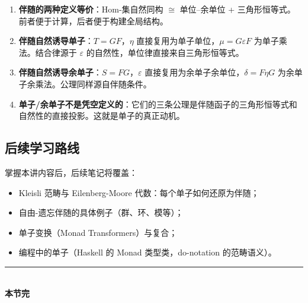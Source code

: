 \documentclass[12pt,a4paper]{ctexart}
\theoremstyle{definition}
\begin{document}
\begin{enumerate}[nosep]
    \item \textbf{伴随的两种定义等价}：Hom-集自然同构 $\cong$ 单位--余单位 + 三角形恒等式。前者便于计算，后者便于构建全局结构。
    \item \textbf{伴随自然诱导单子}：$T = GF$，$\eta$ 直接复用为单子单位，$\mu = G\varepsilon F$ 为单子乘法。结合律源于 $\varepsilon$ 的自然性，单位律直接来自三角形恒等式。
    \item \textbf{伴随自然诱导余单子}：$S = FG$，$\varepsilon$ 直接复用为余单子余单位，$\delta = F\eta G$ 为余单子余乘法。公理同样源自伴随条件。
    \item \textbf{单子/余单子不是凭空定义的}：它们的三条公理是伴随函子的三角形恒等式和自然性的直接投影。这就是单子的真正动机。
\end{enumerate}

\subsection{后续学习路线}

掌握本讲内容后，后续笔记将覆盖：
\begin{itemize}[nosep]
    \item Kleisli 范畴与 Eilenberg-Moore 代数：每个单子如何还原为伴随；
    \item 自由-遗忘伴随的具体例子（群、环、模等）；
    \item 单子变换（Monad Transformers）与复合；
    \item 编程中的单子（Haskell 的 Monad 类型类，do-notation 的范畴语义）。
\end{itemize}

\vspace{1em}
\begin{center}
\rule{0.5\textwidth}{0.5pt}\\[0.5em]
\textbf{本节完}
\end{center}
\end{document}
